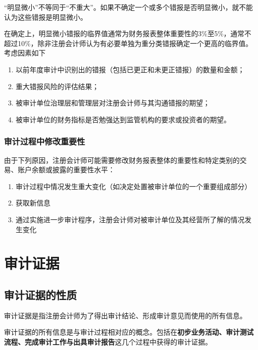 \documentclass[UTF8,12pt]{ctexart}
\numberwithin{equation}{section} %
\numberwithin{figure}{section}
\numberwithin{table}{section}
\begin{document}
	“明显微小”不等同于“不重大”。如果不确定一个或多个错报是否明显微小，就不能认为这些错报是明显微小。
	
	在确定上，明显微小错报的临界值通常为财务报表整体重要性的3\%至5\%，通常不超过10\%，除非注册会计师认为有必要单独为重分类错报确定一个更高的临界值。考虑因素如下
	\begin{enumerate}
		\item 以前年度审计中识别出的错报（包括已更正和未更正错报）的数量和金额；
		
		\item 重大错报风险的评估结果；
		
		\item 被审计单位治理层和管理层对注册会计师与其沟通错报的期望；
		
		\item 被审计单位的财务指标是否勉强达到监管机构的要求或投资者的期望。
		
	\end{enumerate}

	
	\subsubsection{审计过程中修改重要性}
	由于下列原因，注册会计师可能需要修改财务报表整体的重要性和特定类别的交易、账户余额或披露的重要性水平：
	\begin{enumerate}
		\item 审计过程中情况发生重大变化（如决定处置被审计单位的一个重要组成部分）
		
		\item 获取新信息
		
		\item 通过实施进一步审计程序，注册会计师对被审计单位及其经营所了解的情况发生变化
	\end{enumerate}
	
	
	
	
	
	\newpage
	\section{审计证据}	
	\subsection{审计证据的性质}
	审计证据是指注册会计师为了得出审计结论、形成审计意见而使用的所有信息。
	
	审计证据的所有信息是与审计过程相对应的概念。包括在\textbf{初步业务活动、审计测试流程、完成审计工作与出具审计报告}这几个过程中获得的审计证据。
	
\end{document}
